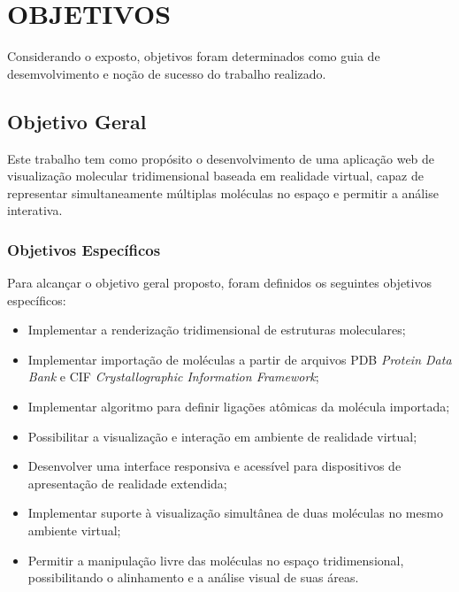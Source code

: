 \chapter{\MakeUppercase{Objetivos}}\label{chap:objetivos}

Considerando o exposto, objetivos foram determinados como guia de desemvolvimento e noção de sucesso do trabalho realizado.

\section{Objetivo Geral}

Este trabalho tem como propósito o desenvolvimento de uma aplicação web de visualização molecular tridimensional baseada em realidade virtual, capaz de representar simultaneamente múltiplas moléculas no espaço e permitir a análise interativa.

\subsection{Objetivos Específicos}
Para alcançar o objetivo geral proposto, foram definidos os seguintes objetivos específicos:

\begin{itemize}
	\item Implementar a renderização tridimensional de estruturas moleculares;
	\item Implementar importação de moléculas a partir de arquivos PDB \textit{Protein Data Bank} e CIF \textit{Crystallographic Information Framework};
	\item Implementar algoritmo para definir ligações atômicas da molécula importada;
	\item Possibilitar a visualização e interação em ambiente de realidade virtual;
	\item Desenvolver uma interface responsiva e acessível para dispositivos de apresentação de realidade extendida;
	\item Implementar suporte à visualização simultânea de duas moléculas no mesmo ambiente virtual;
	\item Permitir a manipulação livre das moléculas no espaço tridimensional, possibilitando o alinhamento e a análise visual de suas áreas.
\end{itemize}